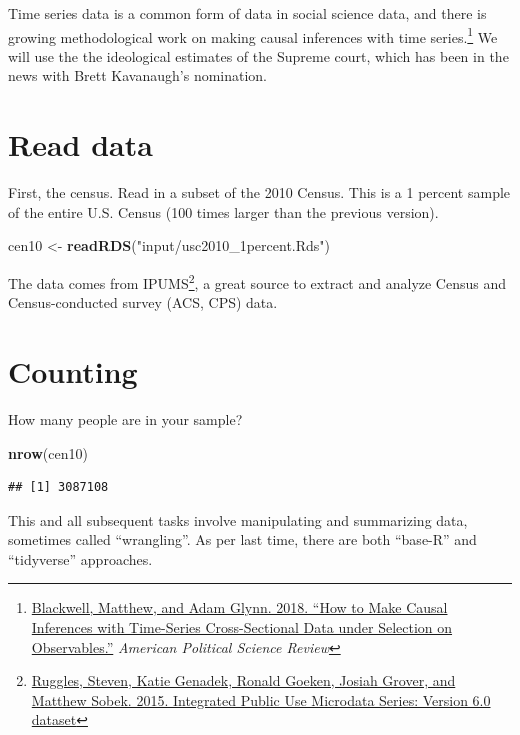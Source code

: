 \documentclass[]{book}
\newenvironment{Shaded}{\begin{snugshade}}{\end{snugshade}}
\newcommand{\KeywordTok}[1]{\textcolor[rgb]{0.13,0.29,0.53}{\textbf{#1}}}
\newcommand{\NormalTok}[1]{#1}
\newcommand{\StringTok}[1]{\textcolor[rgb]{0.31,0.60,0.02}{#1}}
\let\rmarkdownfootnote\footnote%
\def\footnote{\protect\rmarkdownfootnote}
\theoremstyle{definition}
\theoremstyle{definition}
\theoremstyle{definition}
\theoremstyle{remark}
\begin{document}
Time series data is a common form of data in social science data, and there is growing methodological work on making causal inferences with time series.\footnote{\href{https://doi.org/10.1017/S0003055418000357}{Blackwell, Matthew, and Adam Glynn. 2018. ``How to Make Causal Inferences with Time-Series Cross-Sectional Data under Selection on Observables.''} \emph{American Political Science Review}} We will use the the ideological estimates of the Supreme court, which has been in the news with Brett Kavanaugh's nomination.

\hypertarget{read-data-2}{%
\section{Read data}\label{read-data-2}}

First, the census. Read in a subset of the 2010 Census. This is a 1 percent sample of the entire U.S. Census (100 times larger than the previous version).

\begin{Shaded}
\begin{Highlighting}[]
\NormalTok{cen10 <-}\StringTok{ }\KeywordTok{readRDS}\NormalTok{(}\StringTok{"input/usc2010_1percent.Rds"}\NormalTok{)}
\end{Highlighting}
\end{Shaded}

The data comes from IPUMS\footnote{\href{http://doi.org/10.18128/D010.V6.0}{Ruggles, Steven, Katie Genadek, Ronald Goeken, Josiah Grover, and Matthew Sobek. 2015. Integrated Public Use Microdata Series: Version 6.0 dataset}}, a great source to extract and analyze Census and Census-conducted survey (ACS, CPS) data.

\hypertarget{counting}{%
\section{Counting}\label{counting}}

How many people are in your sample?

\begin{Shaded}
\begin{Highlighting}[]
\KeywordTok{nrow}\NormalTok{(cen10)}
\end{Highlighting}
\end{Shaded}

\begin{verbatim}
## [1] 3087108
\end{verbatim}

This and all subsequent tasks involve manipulating and summarizing data, sometimes called ``wrangling''. As per last time, there are both ``base-R'' and ``tidyverse'' approaches.
\end{document}
